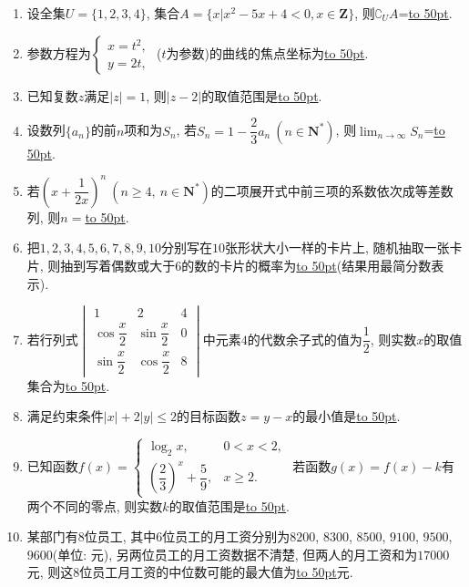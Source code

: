 \documentclass[10pt,a4paper]{article}
\newcommand{\blank}[1]{\underline{\hbox to #1pt{}}}
\begin{document}
\begin{enumerate}[1.]
\item 设全集$U=\{1,2,3,4\}$, 集合$A=\{x|x^2-5x+4<0,x\in \mathbf{Z}\}$, 则$\complement_U A$=\blank{50}.
\item 参数方程为$\begin{cases} x=t^2, \\ y=2t, \end{cases}$ ($t$为参数)的曲线的焦点坐标为\blank{50}.
\item 已知复数$z$满足$|z|=1$, 则$|z-2|$的取值范围是\blank{50}.
\item 设数列$\{a_n\}$的前$n$项和为$S_n$, 若$S_n=1-\dfrac23{a_n} \ (n\in \mathbf{N}^*)$, 则$\displaystyle\lim_{n\to\infty}S_n$=\blank{50}.
\item 若$(x+\dfrac1{2x})^n \ (n\ge 4, \ n\in \mathbf{N}^*)$的二项展开式中前三项的系数依次成等差数列, 则$n=$\blank{50}.
\item 把$1,2,3,4,5,6,7,8,9,10$分别写在$10$张形状大小一样的卡片上, 随机抽取一张卡片, 则抽到写着偶数或大于$6$的数的卡片的概率为\blank{50}(结果用最简分数表示).
\item 若行列式$\begin{vmatrix} 1 & 2 & 4 \\ \cos \dfrac x2 & \sin \dfrac x2 & 0 \\ \sin \dfrac x2 & \cos \dfrac x2 & 8 \end{vmatrix}$中元素$4$的代数余子式的值为$\dfrac12$, 则实数$x$的取值集合为\blank{50}.
\item 满足约束条件$|x|+2|y|\le 2$的目标函数$z=y-x$的最小值是\blank{50}.
\item 已知函数$f(x)=\begin{cases} \log_2 x, & 0<x<2, \\ (\dfrac23)^x+\dfrac59, & x\ge 2. \end{cases}$ 若函数$g(x)=f(x)-k$有两个不同的零点, 则实数$k$的取值范围是\blank{50}.
\item 某部门有$8$位员工, 其中$6$位员工的月工资分别为$8200$, $8300$, $8500$, $9100$, $9500$, $9600$(单位: 元), 另两位员工的月工资数据不清楚, 但两人的月工资和为$17000$元, 则这$8$位员工月工资的中位数可能的最大值为\blank{50}元.



\end{enumerate}
\end{document}
